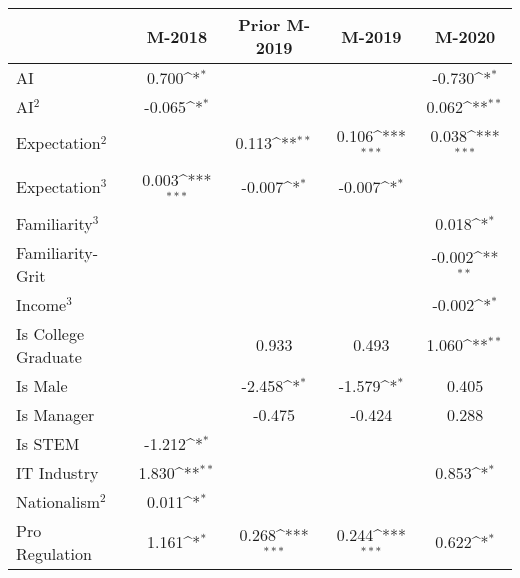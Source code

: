 {
\def\sym#1{\ifmmode^{#1}\else\(^{#1}\)\fi}
\begin{tabular}{l*{4}{c}}
    \toprule
                        & M-2018         & Prior M-2019   & M-2019         & M-2020                \\
    \midrule
    AI                  & 0.700\sym{*}   &                &                & -0.730\sym{*}         \\
    \addlinespace
    AI$^2$              & -0.065\sym{*}  &                &                & 0.062\sym{**}         \\
    \addlinespace
    Expectation$^2$     &                & 0.113\sym{**}  & 0.106\sym{***} & 0.038\sym{***}        \\
    \addlinespace
    Expectation$^3$     & 0.003\sym{***} & -0.007\sym{*}  & -0.007\sym{*}  &                       \\
    \addlinespace
    Familiarity$^3$     &                &                &                & 0.018\sym{*}          \\
    \addlinespace
    Familiarity-Grit    &                &                &                & -0.002\sym{**}        \\
    \addlinespace
    Income$^3$          &                &                &                & -0.002\sym{*}         \\
    \addlinespace
    Is College Graduate &                & 0.933          & 0.493          & 1.060\sym{**}         \\
    \addlinespace
    Is Male             &                & -2.458\sym{*}  & -1.579\sym{*}  & 0.405                 \\
    \addlinespace
    Is Manager          &                & -0.475         & -0.424         & 0.288                 \\
    \addlinespace
    Is STEM             & -1.212\sym{*}  &                &                &                       \\
    \addlinespace
    IT Industry         & 1.830\sym{**}  &                &                & 0.853\sym{*}          \\
    \addlinespace
    Nationalism$^2$     & 0.011\sym{*}   &                &                &                       \\
    \addlinespace
    Pro Regulation      & 1.161\sym{*}   & 0.268\sym{***} & 0.244\sym{***} & 0.622\sym{*}          \\

\end{tabular}}
